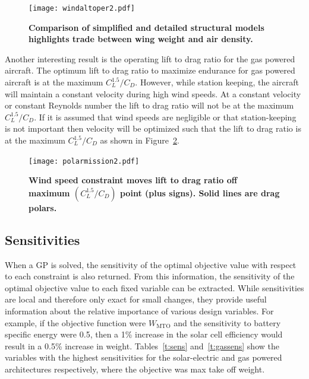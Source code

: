 \begin{figure}[H]
	\begin{center}
	\texttt{[image: windaltoper2.pdf]}
 \caption{\textbf{Comparison of simplified and detailed structural models highlights trade between wing weight and air density.}}
 \label{f:altoper}
	\end{center}
\end{figure}

Another interesting result is the operating lift to drag ratio for the gas powered aircraft.  
The optimum lift to drag ratio to maximize endurance for gas powered aircraft is at the maximum $C_L^{1.5}/C_D$.\cite{br2}  
However, while station keeping, the aircraft will maintain a constant velocity during high wind speeds.  
At a constant velocity or constant Reynolds number the lift to drag ratio will not be at the maximum $C_L^{1.5}/C_D$.  
If it is assumed that wind speeds are negligible or that station-keeping is not important then velocity will be optimized such that the lift to drag ratio is at the maximum $C_L^{1.5}/C_D$ as shown in Figure~\ref{f:polarmission}.

\begin{figure}[H]
	\begin{center}
	\texttt{[image: polarmission2.pdf]}
    \caption{\textbf{Wind speed constraint moves lift to drag ratio off maximum $(C_L^{1.5}/C_D)$ point (plus signs). Solid lines are drag polars.}}
 \label{f:polarmission}
	\end{center}
\end{figure}

\subsection{Sensitivities}

When a GP is solved, the sensitivity of the optimal objective value with respect to each constraint is also returned.  
From this information, the sensitivity of the optimal objective value to each fixed variable can be extracted.\cite{hoburgthesis} 
While sensitivities are local and therefore only exact for small changes, they provide useful information about the relative importance of various design variables. 
For example, if the objective function were $W_{\text{MTO}}$ and the sensitivity to battery specific energy were 0.5, then a 1\% increase in the solar cell efficiency would result in a 0.5\% increase in weight.  
Tables~\ref{t:sens} and~\ref{t:gassens} show the variables with the highest sensitivities for the solar-electric and gas powered architectures respectively, where the objective was max take off weight.

